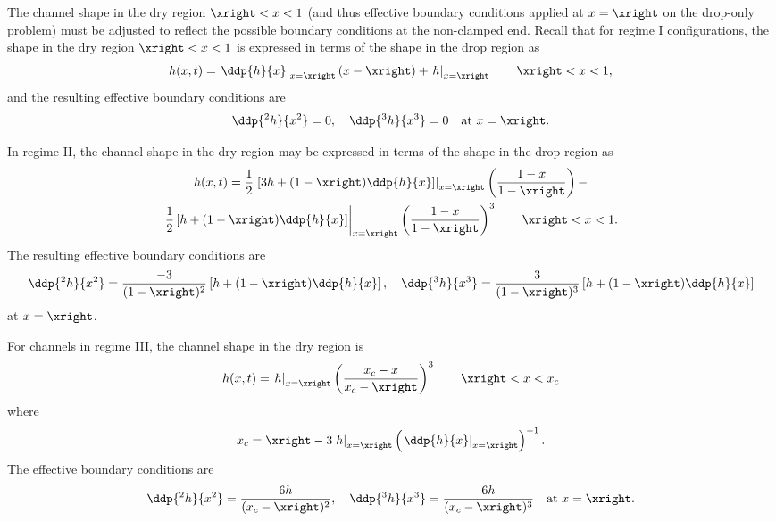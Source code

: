 The channel shape in the dry region $\xright < x < 1$ (and thus effective boundary conditions applied at $x = \xright$ on the drop-only problem) must be adjusted to reflect the possible boundary conditions at the non-clamped end. Recall that for regime I configurations, the shape in the dry region $\xright < x < 1$ is expressed in terms of the shape in the drop region as
\begin{equation}
h(x,t) = \left.\ddp{h}{x}\right|_{x = \xright}(x - \xright) + \left.h\right|_{x = \xright} \qquad \xright < x <1,
\end{equation}
and the resulting effective boundary conditions are
\begin{equation}
\ddp{^2 h}{x^2} = 0, \quad \ddp{^3 h}{x^3} = 0 \quad \text{at}~x = \xright.
\end{equation}

In regime II, the channel shape in the dry region may be expressed in terms of the shape in the drop region as
\begin{multline}\label{E:Ch4:Geometric:Numerics:DryShapeRegimeII}
h(x,t) =\frac{1}{2}\left.\left[3 h + (1 -\xright)\ddp{h}{x}\right]\right|_{x = \xright} \left(\frac{1-x}{1-\xright}\right)-\\ \left.\frac{1}{2} \left[h + (1- \xright) \ddp{h}{x}\right]\right|_{x = \xright}\left(\frac{1-x}{1-\xright}\right)^3 \qquad \xright < x < 1.
\end{multline}
The resulting effective boundary conditions are
\begin{equation}
\ddp{^2 h}{x^2} = \frac{-3}{(1 - \xright)^2}\left[h + (1-\xright) \ddp{h}{x}\right],\quad \ddp{^3 h}{x^3}  =  \frac{3}{(1-\xright)^3}\left[h + (1-\xright) \ddp{h}{x} \right]
\end{equation}
at $x = \xright$.

For channels in regime III, the channel shape in the dry region is
\begin{equation}\label{E:Ch4:Geometric:Numerics:DryShapeRegimeIII}
h(x,t) = \left.h\right|_{x = \xright} \left(\frac{x_c - x}{x_c - \xright}\right)^3 \qquad \xright < x < x_c
\end{equation}
where
\begin{equation}
x_c = \xright - 3  \left.h\right|_{x = \xright} \left(\left.\ddp{h}{x}\right|_{x = \xright}\right)^{-1}.
\end{equation}
The effective boundary conditions are
\begin{equation}
\ddp{^2 h}{x^2} = \frac{6h}{(x_c - \xright)^2}, \quad \ddp{^3 h}{x^3}  = \frac{6h}{(x_c - \xright)^3} \quad \text{at}~x = \xright.
\end{equation}

